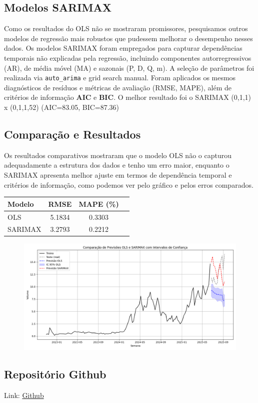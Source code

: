 \documentclass{article}
\begin{document}
\subsection*{Modelos SARIMAX}
Como os resultados do OLS não se mostraram promissores, pesquisamos outros modelos de regressão mais robustos que pudessem melhorar o desempenho nesses dados. Os modelos SARIMAX foram empregados para capturar dependências temporais não explicadas pela regressão, incluindo componentes autorregressivos (AR), de média móvel (MA) e sazonais (P, D, Q, m).  
A seleção de parâmetros foi realizada via \texttt{auto\_arima} e grid search manual. Foram aplicados os mesmos diagnósticos de resíduos e métricas de avaliação (RMSE, MAPE), além de critérios de informação \textbf{AIC} e \textbf{BIC}. O melhor resultado foi
o SARIMAX (0,1,1) x (0,1,1,52) (AIC=83.05, BIC=87.36)

\subsection*{Comparação e Resultados}
Os resultados comparativos mostraram que o modelo OLS não o  capturou adequadamente a estrutura dos dados e tenho um erro maior, enquanto o SARIMAX apresenta melhor ajuste em termos de dependência temporal e critérios de informação, como podemos ver pelo gráfico e pelos erros comparados.  

\begin{table}[h]
    \centering
    \begin{tabular}{|l|c|c|c|}
        \hline
        \textbf{Modelo}  & \textbf{RMSE} & \textbf{MAPE (\%)} \\
        \hline
        OLS & 5.1834 & 0.3303 \\
        SARIMAX  & 3.2793 & 0.2212 \\
        \hline
    \end{tabular}
    \label{tab:baseline_results}
\end{table}

\begin{figure}[h]
    \centering
    \includegraphics[width=0.75\linewidth]{images/forecast_comparison.png}
\end{figure}

\subsection*{Repositório Github}

Link: \href{https://github.com/eduardammag/time-series/tree/main}{Github}
\end{document}
